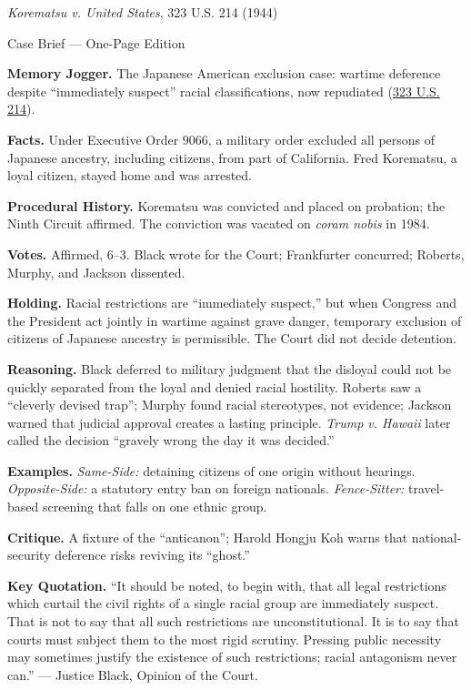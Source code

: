 \documentclass[12pt]{article}
\begin{document}
\begin{center}
{\Large \textit{Korematsu v. United States}, 323 U.S. 214 (1944)\par}
\vspace{0.3em}
{\normalsize Case Brief --- One-Page Edition\par}
\end{center}

\textbf{Memory Jogger.} The Japanese American exclusion case: wartime deference despite ``immediately suspect'' racial classifications, now repudiated (\href{https://www.courtlistener.com/opinion/104040/korematsu-v-united-states/}{323 U.S. 214}).

\textbf{Facts.} Under Executive Order 9066, a military order excluded all persons of Japanese ancestry, including citizens, from part of California. Fred Korematsu, a loyal citizen, stayed home and was arrested.

\textbf{Procedural History.} Korematsu was convicted and placed on probation; the Ninth Circuit affirmed. The conviction was vacated on \textit{coram nobis} in 1984.

\textbf{Votes.} Affirmed, 6--3. Black wrote for the Court; Frankfurter concurred; Roberts, Murphy, and Jackson dissented.

\textbf{Holding.} Racial restrictions are ``immediately suspect,'' but when Congress and the President act jointly in wartime against grave danger, temporary exclusion of citizens of Japanese ancestry is permissible. The Court did not decide detention.

\textbf{Reasoning.} Black deferred to military judgment that the disloyal could not be quickly separated from the loyal and denied racial hostility. Roberts saw a ``cleverly devised trap''; Murphy found racial stereotypes, not evidence; Jackson warned that judicial approval creates a lasting principle. \textit{Trump v. Hawaii} later called the decision ``gravely wrong the day it was decided.''

\textbf{Examples.} \emph{Same-Side:} detaining citizens of one origin without hearings. \emph{Opposite-Side:} a statutory entry ban on foreign nationals. \emph{Fence-Sitter:} travel-based screening that falls on one ethnic group.

\textbf{Critique.} A fixture of the ``anticanon''; Harold Hongju Koh warns that national-security deference risks reviving its ``ghost.''

\textbf{Key Quotation.} ``It should be noted, to begin with, that all legal restrictions which curtail the civil rights of a single racial group are immediately suspect. That is not to say that all such restrictions are unconstitutional. It is to say that courts must subject them to the most rigid scrutiny. Pressing public necessity may sometimes justify the existence of such restrictions; racial antagonism never can.'' --- Justice Black, Opinion of the Court.
\end{document}
